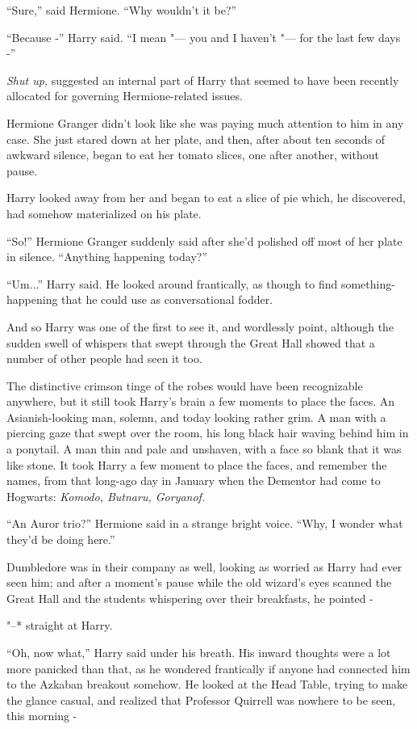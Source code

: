 ``Sure,'' said Hermione. ``Why wouldn't it be?''

``Because -'' Harry said. ``I mean "--- you and I haven't "--- for the last
few days -''

\emph{Shut up,} suggested an internal part of Harry that seemed to have
been recently allocated for governing Hermione-related issues.

Hermione Granger didn't look like she was paying much attention to him
in any case. She just stared down at her plate, and then, after about
ten seconds of awkward silence, began to eat her tomato slices, one
after another, without pause.

Harry looked away from her and began to eat a slice of pie which, he
discovered, had somehow materialized on his plate.

``So!'' Hermione Granger suddenly said after she'd polished off most of
her plate in silence. ``Anything happening today?''

``Um...'' Harry said. He looked around frantically, as though to
find something-happening that he could use as conversational fodder.

And so Harry was one of the first to see it, and wordlessly point,
although the sudden swell of whispers that swept through the Great Hall
showed that a number of other people had seen it too.

The distinctive crimson tinge of the robes would have been recognizable
anywhere, but it still took Harry's brain a few moments to place the
faces. An Asianish-looking man, solemn, and today looking rather grim. A
man with a piercing gaze that swept over the room, his long black hair
waving behind him in a ponytail. A man thin and pale and unshaven, with
a face so blank that it was like stone. It took Harry a few moment to
place the faces, and remember the names, from that long-ago day in
January when the Dementor had come to Hogwarts: \emph{Komodo, Butnaru,
Goryanof.}

``An Auror trio?'' Hermione said in a strange bright voice. ``Why, I
wonder what they'd be doing here.''

Dumbledore was in their company as well, looking as worried as Harry had
ever seen him; and after a moment's pause while the old wizard's eyes
scanned the Great Hall and the students whispering over their
breakfasts, he pointed -

"--* straight at Harry.

``Oh, now what,'' Harry said under his breath. His inward thoughts were
a lot more panicked than that, as he wondered frantically if anyone had
connected him to the Azkaban breakout somehow. He looked at the Head
Table, trying to make the glance casual, and realized that Professor
Quirrell was nowhere to be seen, this morning -

